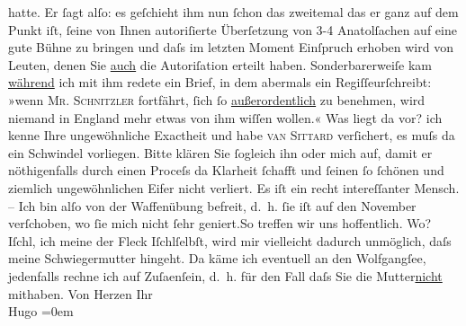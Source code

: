 \begin{ledgroupsized}[t]{13cm}
               hatte. Er ſagt alſo: es geſchieht ihm nun ſchon das zweitemal das er ganz auf dem
               Punkt iſt, ſeine von Ihnen autoriſierte Überſetzung von 3-4 Anatolſachen auf eine {\pb}gute Bühne zu bringen und daſs im
               letzten Moment Einſpruch erhoben wird von Leuten, denen Sie \uline{auch} die Autoriſation erteilt haben. Sonderbarerweiſe kam \uline{während} ich mit ihm redete ein Brief, in dem abermals ein
                  Regiſſeurſchreibt: »wenn \textsc{Mr.
                  Schnitzler} fortfährt, ſich ſo \uline{außerordentlich}
               zu benehmen, wird niemand in England mehr etwas
               von ihm wiſſen {\pb}wollen.« Was liegt
               da vor? ich kenne Ihre ungewöhnliche Exactheit und habe \textsc{van Sittard} verſichert, es muſs da ein Schwindel vorliegen. Bitte klären Sie ſogleich ihn
               oder mich auf, damit er nöthigenfalls durch einen Proceſs da Klarheit ſchafft und
               ſeinen ſo ſchönen und ziemlich ungewöhnlichen Eifer nicht verliert. Es iſt ein recht
               intereſſanter Mensch.\pend
           \pstart
           \centering{}{\pb}–\pend
           \pstart
           \noindent{}Ich bin alſo von der Waffenübung befreit, d. h. ſie iſt auf den November
               verſchoben, wo ſie mich nicht ſehr geniert.\hspace*{1.5em}So
               treffen wir uns hoffentlich. Wo? Iſchl, ich meine
               der Fleck Iſchlſelbſt, wird mir vielleicht dadurch unmöglich, daſs
               meine Schwiegermutter
               hingeht. Da käme ich eventuell an den Wolfgangſee, jedenfalls rechne ich auf Zuſa{\geminationm}enſein, d. h. für den Fall daſs Sie die Mutter\uline{nicht} mithaben.\pend
           \pstart
           Von Herzen Ihr{\\[\baselineskip]}\spacefill\mbox{Hugo}\pend
           \leftskip=0em{}
         
         \endnumbering{}\end{ledgroupsized}  \newcommand{\dateiname}{L01426}\newcommand{\titel}{Hugo von Hofmannsthal an Arthur Schnitzler, 12. 8. 1904}\newcommand{\editorInnen}{Martin Anton Müller und Gerd-Hermann Susen}
      